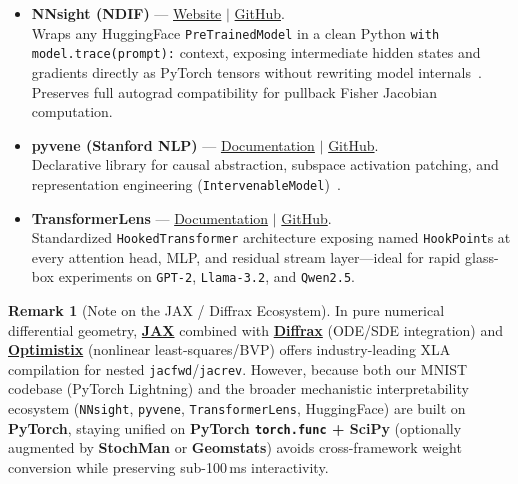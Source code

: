 \documentclass[11pt,a4paper]{article}
\theoremstyle{definition}
\newtheorem{remark}{Remark}[section]
\begin{document}
\begin{itemize}[leftmargin=*]
    \item \textbf{NNsight (NDIF)} ---
    \href{https://nnsight.net}{Website} $\mid$ \href{https://github.com/ndif-team/nnsight}{GitHub}.\\
    Wraps any HuggingFace \texttt{PreTrainedModel} in a clean Python \texttt{with model.trace(prompt):} context, exposing intermediate hidden states and gradients directly as PyTorch tensors without rewriting model internals~\cite{fiotto2024nnsight}. Preserves full autograd compatibility for pullback Fisher Jacobian computation.
    \item \textbf{pyvene (Stanford NLP)} ---
    \href{https://stanfordnlp.github.io/pyvene/}{Documentation} $\mid$ \href{https://github.com/stanfordnlp/pyvene}{GitHub}.\\
    Declarative library for causal abstraction, subspace activation patching, and representation engineering (\texttt{IntervenableModel})~\cite{wu2024pyvene}.
    \item \textbf{TransformerLens} ---
    \href{https://transformerlensorg.github.io/TransformerLens/}{Documentation} $\mid$ \href{https://github.com/TransformerLensOrg/TransformerLens}{GitHub}.\\
    Standardized \texttt{HookedTransformer} architecture exposing named \texttt{HookPoint}s at every attention head, MLP, and residual stream layer---ideal for rapid glass-box experiments on \texttt{GPT-2}, \texttt{Llama-3.2}, and \texttt{Qwen2.5}.
\end{itemize}

\begin{remark}[Note on the JAX / Diffrax Ecosystem]
In pure numerical differential geometry, \href{https://github.com/jax-ml/jax}{\textbf{JAX}} combined with \href{https://docs.kidger.site/diffrax/}{\textbf{Diffrax}} (ODE/SDE integration) and \href{https://docs.kidger.site/optimistix/}{\textbf{Optimistix}} (nonlinear least-squares/BVP) offers industry-leading XLA compilation for nested \texttt{jacfwd}/\texttt{jacrev}. However, because both our MNIST codebase (PyTorch Lightning) and the broader mechanistic interpretability ecosystem (\texttt{NNsight}, \texttt{pyvene}, \texttt{TransformerLens}, HuggingFace) are built on \textbf{PyTorch}, staying unified on \textbf{PyTorch \texttt{torch.func} + SciPy} (optionally augmented by \textbf{StochMan} or \textbf{Geomstats}) avoids cross-framework weight conversion while preserving sub-100\,ms interactivity.
\end{remark}
\end{document}
